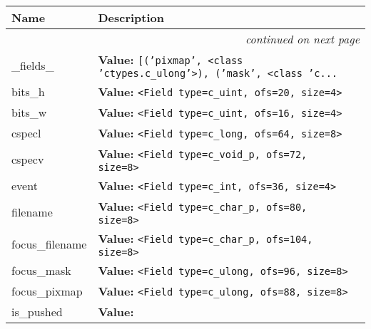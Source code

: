     \vspace{-1cm}
\hspace{\varindent}\begin{longtable}{|p{\varnamewidth}|p{\vardescrwidth}|l}
\cline{1-2}
\cline{1-2} \centering \textbf{Name} & \centering \textbf{Description}& \\
\cline{1-2}
\endhead\cline{1-2}\multicolumn{3}{r}{\small\textit{continued on next page}}\\\endfoot\cline{1-2}
\endlastfoot\raggedright \_\-f\-i\-e\-l\-d\-s\-\_\- & \raggedright \textbf{Value:} 
{\tt \texttt{[}\texttt{(}\texttt{'}\texttt{pixmap}\texttt{'}\texttt{, }{\textless}class 'ctypes.c\_ulong'{\textgreater}\texttt{)}\texttt{, }\texttt{(}\texttt{'}\texttt{mask}\texttt{'}\texttt{, }{\textless}class 'c\texttt{...}}&\\
\cline{1-2}
\raggedright b\-i\-t\-s\-\_\-h\- & \raggedright \textbf{Value:} 
{\tt {\textless}Field type=c\_uint, ofs=20, size=4{\textgreater}}&\\
\cline{1-2}
\raggedright b\-i\-t\-s\-\_\-w\- & \raggedright \textbf{Value:} 
{\tt {\textless}Field type=c\_uint, ofs=16, size=4{\textgreater}}&\\
\cline{1-2}
\raggedright c\-s\-p\-e\-c\-l\- & \raggedright \textbf{Value:} 
{\tt {\textless}Field type=c\_long, ofs=64, size=8{\textgreater}}&\\
\cline{1-2}
\raggedright c\-s\-p\-e\-c\-v\- & \raggedright \textbf{Value:} 
{\tt {\textless}Field type=c\_void\_p, ofs=72, size=8{\textgreater}}&\\
\cline{1-2}
\raggedright e\-v\-e\-n\-t\- & \raggedright \textbf{Value:} 
{\tt {\textless}Field type=c\_int, ofs=36, size=4{\textgreater}}&\\
\cline{1-2}
\raggedright f\-i\-l\-e\-n\-a\-m\-e\- & \raggedright \textbf{Value:} 
{\tt {\textless}Field type=c\_char\_p, ofs=80, size=8{\textgreater}}&\\
\cline{1-2}
\raggedright f\-o\-c\-u\-s\-\_\-f\-i\-l\-e\-n\-a\-m\-e\- & \raggedright \textbf{Value:} 
{\tt {\textless}Field type=c\_char\_p, ofs=104, size=8{\textgreater}}&\\
\cline{1-2}
\raggedright f\-o\-c\-u\-s\-\_\-m\-a\-s\-k\- & \raggedright \textbf{Value:} 
{\tt {\textless}Field type=c\_ulong, ofs=96, size=8{\textgreater}}&\\
\cline{1-2}
\raggedright f\-o\-c\-u\-s\-\_\-p\-i\-x\-m\-a\-p\- & \raggedright \textbf{Value:} 
{\tt {\textless}Field type=c\_ulong, ofs=88, size=8{\textgreater}}&\\
\cline{1-2}
\raggedright i\-s\-\_\-p\-u\-s\-h\-e\-d\- & \raggedright \textbf{Value:} 

\end{longtable}
